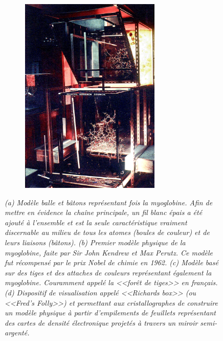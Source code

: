 \begin{figure}
\begin{subfigure}{.5\textwidth}
  \caption{}
  \label{Fig:kendrew_myoglobin_forest_of_rods}
  \end{subfigure}%
  \begin{subfigure}{.5\textwidth}
  \centering
  {\includegraphics[height=9.5cm]{./figures/ch1/fred_richards_ribonuclease}}
  \caption{}
  \label{Fig:fred_richards_ribonuclease}
  \end{subfigure}%
  \caption[Différents modèles et techniques physiques de représentation de protéines.]{\it 
  (a) Modèle balle et bâtons représentant fois la myoglobine. Afin de mettre en évidence la chaîne principale, un fil blanc épais a été ajouté à l'ensemble et est la seule caractéristique vraiment discernable au milieu de tous les atomes (boules de couleur) et de leurs liaisons (bâtons).
  (b) Premier modèle physique de la myoglobine, faite par Sir John Kendrew et Max Perutz. Ce modèle fut récompensé par le prix Nobel de chimie en 1962.
  (c) Modèle basé sur des tiges et des attaches de couleurs représentant également la myoglobine. Couramment appelé la <<forêt de tiges>> en français.  
  (d) Dispositif de visualisation appelé <<Richards box>> (ou <<Fred's Folly>>) et permettant aux cristallographes de construire un modèle physique à partir d'empilements de feuillets représentant des cartes de densité électronique projetés à travers un miroir semi-argenté.}
\end{figure}

